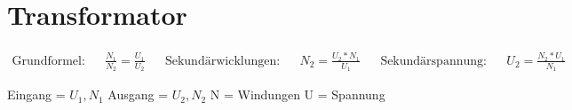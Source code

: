 \section*{Transformator}



\begin{tcolorbox}[colback=white,top=0pt]
    \begin{align*}
        \text{Grundformel:}        & & \frac{N_1}{N_2} = \frac{U_1}{U_2}      & &
        \text{Sekundärwicklungen:} & & N_2 = \frac{U_2 * N_1}{U_1}       & &
        \text{Sekundärspannung:}   & & U_2 = \frac{N_2 * U_1}{N_1}
    \end{align*}
    \tcblower
    \begin{center}
        Eingang = \(U_1, N_1\) Ausgang = \(U_2, N_2\) \hspace{5em}  N = Windungen U = Spannung\
    \end{center}
\end{tcolorbox}